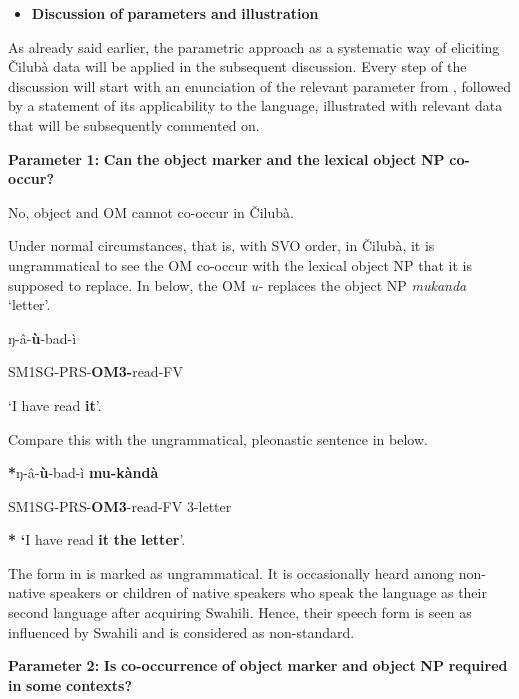 \documentclass[output=paper]{langscibook}
\begin{document}
\begin{itemize}
\item \textbf{Discussion} \textbf{of} \textbf{parameters} \textbf{and} \textbf{illustration}
\end{itemize}

As already said earlier, the parametric approach as a systematic way of eliciting Čilubà data will be applied in the subsequent discussion. Every step of the discussion will start with an enunciation of the relevant parameter from \citet{MartenEtAl2007}, followed by a statement of its applicability to the language, illustrated with relevant data that will be subsequently commented on.

\textbf{Parameter} \textbf{1:} \textbf{Can} \textbf{the} \textbf{object} \textbf{marker} \textbf{and} \textbf{the} \textbf{lexical} \textbf{object} \textbf{NP} \textbf{co-occur?}

No, object and OM cannot co-occur in Čilubà.

Under normal circumstances, that is, with SVO order, in Čilubà, it is ungrammatical to see the OM co-occur with the lexical object NP that it is supposed to replace. In  below, the OM \textit{u-} replaces the object NP \textit{mukanda} ‘letter’.

\ea%
    \label{ex:lukusa:2}
    \z

            ŋ-â-\textbf{ù}{}-bad-ì

    SM1SG-PRS-\textbf{OM3-}read-FV

\glt ‘I have read \textbf{it}’.

Compare this with the ungrammatical, pleonastic sentence in  below.

\ea%
    \label{ex:lukusa:3}
    \z

            \textbf{*}ŋ-â-\textbf{ù}{}-bad-ì               \textbf{mu-kàndà}

      SM1SG-PRS-\textbf{OM3}{}-read-FV    3-letter

    \textbf{*} \textbf{‘}I have read \textbf{it} \textbf{the} \textbf{letter}’.

The form in  is marked as ungrammatical. It is occasionally heard among non-native speakers or children of native speakers who speak the language as their second language after acquiring Swahili. Hence, their speech form is seen as influenced by Swahili and is considered as non-standard.

\textbf{Parameter} \textbf{2:} \textbf{Is} \textbf{co-occurrence} \textbf{of} \textbf{object} \textbf{marker} \textbf{and} \textbf{object} \textbf{NP} \textbf{required} \textbf{in} \textbf{some} \textbf{contexts?}
\end{document}

